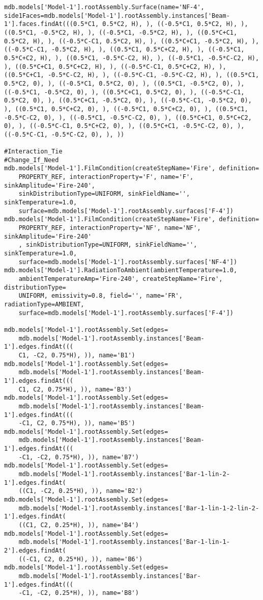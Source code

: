 \documentclass[12pt, letterpaper, oneside]{report}
\begin{document}
\begin{lstlisting}[frame=none]
mdb.models['Model-1'].rootAssembly.Surface(name='NF-4', side1Faces=mdb.models['Model-1'].rootAssembly.instances['Beam-1'].faces.findAt(((0.5*C1, 0.5*C2, H), ), ((-0.5*C1, 0.5*C2, H), ), ((0.5*C1, -0.5*C2, H), ), ((-0.5*C1, -0.5*C2, H), ), ((0.5*C+C1, 0.5*C2, H), ), ((-0.5*C-C1, 0.5*C2, H), ), ((0.5*C+C1, -0.5*C2, H), ), ((-0.5*C-C1, -0.5*C2, H), ), ((0.5*C1, 0.5*C+C2, H), ), ((-0.5*C1, 0.5*C+C2, H), ), ((0.5*C1, -0.5*C-C2, H), ), ((-0.5*C1, -0.5*C-C2, H), ), ((0.5*C+C1, 0.5*C+C2, H), ), ((-0.5*C-C1, 0.5*C+C2, H), ), ((0.5*C+C1, -0.5*C-C2, H), ), ((-0.5*C-C1, -0.5*C-C2, H), ), ((0.5*C1, 0.5*C2, 0), ), ((-0.5*C1, 0.5*C2, 0), ), ((0.5*C1, -0.5*C2, 0), ), ((-0.5*C1, -0.5*C2, 0), ), ((0.5*C+C1, 0.5*C2, 0), ), ((-0.5*C-C1, 0.5*C2, 0), ), ((0.5*C+C1, -0.5*C2, 0), ), ((-0.5*C-C1, -0.5*C2, 0), ), ((0.5*C1, 0.5*C+C2, 0), ), ((-0.5*C1, 0.5*C+C2, 0), ), ((0.5*C1, -0.5*C-C2, 0), ), ((-0.5*C1, -0.5*C-C2, 0), ), ((0.5*C+C1, 0.5*C+C2, 0), ), ((-0.5*C-C1, 0.5*C+C2, 0), ), ((0.5*C+C1, -0.5*C-C2, 0), ), ((-0.5*C-C1, -0.5*C-C2, 0), ), ))

#Interaction_Tie
#Change_If_Need
mdb.models['Model-1'].FilmCondition(createStepName='Fire', definition=
    PROPERTY_REF, interactionProperty='F', name='F', sinkAmplitude='Fire-240', 
    sinkDistributionType=UNIFORM, sinkFieldName='', sinkTemperature=1.0, 
    surface=mdb.models['Model-1'].rootAssembly.surfaces['F-4'])
mdb.models['Model-1'].FilmCondition(createStepName='Fire', definition=
    PROPERTY_REF, interactionProperty='NF', name='NF', sinkAmplitude='Fire-240'
    , sinkDistributionType=UNIFORM, sinkFieldName='', sinkTemperature=1.0, 
    surface=mdb.models['Model-1'].rootAssembly.surfaces['NF-4'])
mdb.models['Model-1'].RadiationToAmbient(ambientTemperature=1.0, 
    ambientTemperatureAmp='Fire-240', createStepName='Fire', distributionType=
    UNIFORM, emissivity=0.8, field='', name='FR', radiationType=AMBIENT, 
    surface=mdb.models['Model-1'].rootAssembly.surfaces['F-4'])

mdb.models['Model-1'].rootAssembly.Set(edges=
    mdb.models['Model-1'].rootAssembly.instances['Beam-1'].edges.findAt(((
    C1, -C2, 0.75*H), )), name='B1')
mdb.models['Model-1'].rootAssembly.Set(edges=
    mdb.models['Model-1'].rootAssembly.instances['Beam-1'].edges.findAt(((
    C1, C2, 0.75*H), )), name='B3')
mdb.models['Model-1'].rootAssembly.Set(edges=
    mdb.models['Model-1'].rootAssembly.instances['Beam-1'].edges.findAt(((
    -C1, C2, 0.75*H), )), name='B5')
mdb.models['Model-1'].rootAssembly.Set(edges=
    mdb.models['Model-1'].rootAssembly.instances['Beam-1'].edges.findAt(((
    -C1, -C2, 0.75*H), )), name='B7')
mdb.models['Model-1'].rootAssembly.Set(edges=
    mdb.models['Model-1'].rootAssembly.instances['Bar-1-lin-2-1'].edges.findAt(
    ((C1, -C2, 0.25*H), )), name='B2')
mdb.models['Model-1'].rootAssembly.Set(edges=
    mdb.models['Model-1'].rootAssembly.instances['Bar-1-lin-1-2-lin-2-1'].edges.findAt(
    ((C1, C2, 0.25*H), )), name='B4')
mdb.models['Model-1'].rootAssembly.Set(edges=
    mdb.models['Model-1'].rootAssembly.instances['Bar-1-lin-1-2'].edges.findAt(
    ((-C1, C2, 0.25*H), )), name='B6')
mdb.models['Model-1'].rootAssembly.Set(edges=
    mdb.models['Model-1'].rootAssembly.instances['Bar-1'].edges.findAt(((
    -C1, -C2, 0.25*H), )), name='B8')


\end{lstlisting}
\end{document}
